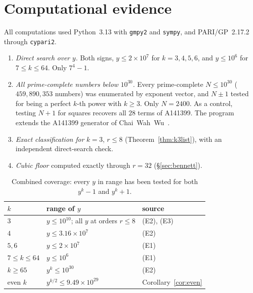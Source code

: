 \documentclass[11pt]{article}
\theoremstyle{definition}
\theoremstyle{remark}
\begin{document}
\section{Computational evidence}\label{sec:evidence}

All computations used Python~3.13 with \texttt{gmpy2} and \texttt{sympy}, and
PARI/GP~2.17.2 through \texttt{cypari2}.

\begin{enumerate}
\item[(E1)] \emph{Direct search over $y$.} Both signs, $y\le2\times10^7$ for
$k=3,4,5,6$, and $y\le10^6$ for $7\le k\le64$. Only $7^4-1$.
\item[(E2)] \emph{All prime-complete numbers below $10^{30}$.} Every
prime-complete $N\le10^{30}$ ($459{,}890{,}353$ numbers) was enumerated by
exponent vector, and $N\pm1$ tested for being a perfect $k$-th power with
$k\ge3$. Only $N=2400$. As a control, testing $N+1$ for squares recovers all
$28$ terms of A141399. The program extends the A141399 generator of
Chai~Wah~Wu~\cite{A141399}.
\item[(E3)] \emph{Exact classification for $k=3$}, $r\le8$
(Theorem~\ref{thm:k3list}), with an independent direct-search check.
\item[(E4)] \emph{Cubic floor} computed exactly through $r=32$
(\S\ref{sec:bennett}).
\end{enumerate}

\begin{table}[ht]
\centering
\caption{Combined coverage: every $y$ in range has been tested for both
$y^k-1$ and $y^k+1$.}
\label{tab:coverage}
\begin{tabular}{lll}
\toprule
$k$ & range of $y$ & source\\
\midrule
$3$ & $y\le10^{10}$; all $y$ at orders $r\le8$ & (E2), (E3)\\
$4$ & $y\le3.16\times10^7$ & (E2)\\
$5,6$ & $y\le2\times10^7$ & (E1)\\
$7\le k\le64$ & $y\le10^6$ & (E1)\\
$k\ge65$ & $y^k\le10^{30}$ & (E2)\\
even $k$ & $y^{k/2}\le9.49\times10^{29}$ & Corollary~\ref{cor:even}\\
\bottomrule
\end{tabular}
\end{table}
\end{document}
